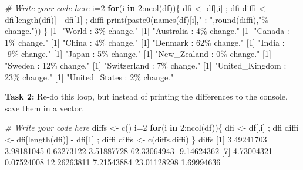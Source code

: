\documentclass[
]{book}
\newenvironment{Shaded}{\begin{snugshade}}{\end{snugshade}}
\newcommand{\CommentTok}[1]{\textcolor[rgb]{0.56,0.35,0.01}{\textit{#1}}}
\newcommand{\ControlFlowTok}[1]{\textcolor[rgb]{0.13,0.29,0.53}{\textbf{#1}}}
\newcommand{\DecValTok}[1]{\textcolor[rgb]{0.00,0.00,0.81}{#1}}
\newcommand{\FloatTok}[1]{\textcolor[rgb]{0.00,0.00,0.81}{#1}}
\newcommand{\FunctionTok}[1]{\textcolor[rgb]{0.00,0.00,0.00}{#1}}
\newcommand{\NormalTok}[1]{#1}
\newcommand{\OtherTok}[1]{\textcolor[rgb]{0.56,0.35,0.01}{#1}}
\newcommand{\SpecialCharTok}[1]{\textcolor[rgb]{0.00,0.00,0.00}{#1}}
\newcommand{\StringTok}[1]{\textcolor[rgb]{0.31,0.60,0.02}{#1}}
\begin{document}
\begin{Shaded}
\begin{Highlighting}[]
\CommentTok{\# Write your code here}
\NormalTok{i}\OtherTok{=}\DecValTok{2}
\ControlFlowTok{for}\NormalTok{(i }\ControlFlowTok{in} \DecValTok{2}\SpecialCharTok{:}\FunctionTok{ncol}\NormalTok{(df))\{}
\NormalTok{  dfi }\OtherTok{\textless{}{-}}\NormalTok{ df[,i] ; dfi}
\NormalTok{  diffi }\OtherTok{\textless{}{-}}\NormalTok{ dfi[}\FunctionTok{length}\NormalTok{(dfi)] }\SpecialCharTok{{-}}\NormalTok{ dfi[}\DecValTok{1}\NormalTok{] ; diffi}
  \FunctionTok{print}\NormalTok{(}\FunctionTok{paste0}\NormalTok{(}\FunctionTok{names}\NormalTok{(df)[i],}\StringTok{" : "}\NormalTok{,}\FunctionTok{round}\NormalTok{(diffi),}\StringTok{"\% change."}\NormalTok{))}
\NormalTok{\}}
\NormalTok{[}\DecValTok{1}\NormalTok{] }\StringTok{"World : 3\% change."}
\NormalTok{[}\DecValTok{1}\NormalTok{] }\StringTok{"Australia : 4\% change."}
\NormalTok{[}\DecValTok{1}\NormalTok{] }\StringTok{"Canada : 1\% change."}
\NormalTok{[}\DecValTok{1}\NormalTok{] }\StringTok{"China : 4\% change."}
\NormalTok{[}\DecValTok{1}\NormalTok{] }\StringTok{"Denmark : 62\% change."}
\NormalTok{[}\DecValTok{1}\NormalTok{] }\StringTok{"India : {-}9\% change."}
\NormalTok{[}\DecValTok{1}\NormalTok{] }\StringTok{"Japan : 5\% change."}
\NormalTok{[}\DecValTok{1}\NormalTok{] }\StringTok{"New\_Zealand : 0\% change."}
\NormalTok{[}\DecValTok{1}\NormalTok{] }\StringTok{"Sweden : 12\% change."}
\NormalTok{[}\DecValTok{1}\NormalTok{] }\StringTok{"Switzerland : 7\% change."}
\NormalTok{[}\DecValTok{1}\NormalTok{] }\StringTok{"United\_Kingdom : 23\% change."}
\NormalTok{[}\DecValTok{1}\NormalTok{] }\StringTok{"United\_States : 2\% change."}
\end{Highlighting}
\end{Shaded}

\textbf{Task 2:} Re-do this loop, but instead of printing the differences to the console, save them in a vector.

\begin{Shaded}
\begin{Highlighting}[]
\CommentTok{\# Write your code here}
\NormalTok{diffs }\OtherTok{\textless{}{-}} \FunctionTok{c}\NormalTok{()}
\NormalTok{i}\OtherTok{=}\DecValTok{2}
\ControlFlowTok{for}\NormalTok{(i }\ControlFlowTok{in} \DecValTok{2}\SpecialCharTok{:}\FunctionTok{ncol}\NormalTok{(df))\{}
\NormalTok{  dfi }\OtherTok{\textless{}{-}}\NormalTok{ df[,i] ; dfi}
\NormalTok{  diffi }\OtherTok{\textless{}{-}}\NormalTok{ dfi[}\FunctionTok{length}\NormalTok{(dfi)] }\SpecialCharTok{{-}}\NormalTok{ dfi[}\DecValTok{1}\NormalTok{] ; diffi}
\NormalTok{  diffs }\OtherTok{\textless{}{-}} \FunctionTok{c}\NormalTok{(diffs,diffi)}
\NormalTok{\}}
\NormalTok{diffs}
\NormalTok{ [}\DecValTok{1}\NormalTok{]  }\FloatTok{3.49241703}  \FloatTok{3.98181045}  \FloatTok{0.63273122}  \FloatTok{3.51887728} \FloatTok{62.33064943} \SpecialCharTok{{-}}\FloatTok{9.14624362}
\NormalTok{ [}\DecValTok{7}\NormalTok{]  }\FloatTok{4.73004321}  \FloatTok{0.07524008} \FloatTok{12.26263811}  \FloatTok{7.21543884} \FloatTok{23.01128298}  \FloatTok{1.69994636}
\end{Highlighting}
\end{Shaded}
\end{document}
